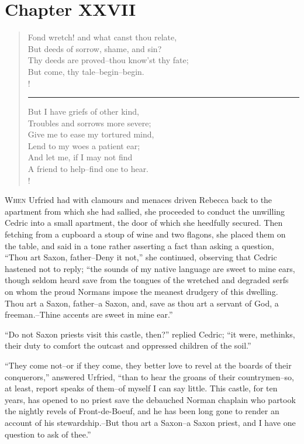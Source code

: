 \chapter{Chapter XXVII}

\begin{verse}
Fond wretch! and what canst thou relate,\\
But deeds of sorrow, shame, and sin?\\
Thy deeds are proved--thou know'st thy fate;\\
But come, thy tale--begin--begin.\\!
\rule{.7\textwidth}{.2pt}

But I have griefs of other kind,\\
Troubles and sorrows more severe;\\
Give me to ease my tortured mind,\\
Lend to my woes a patient ear;\\
And let me, if I may not find\\
A friend to help--find one to hear.\\!
\end{verse}

\lettrine{W}{hen} Urfried had with clamours and menaces driven Rebecca
back to the
apartment from which she had sallied, she proceeded to conduct the
unwilling Cedric into a small apartment, the door of which she heedfully
secured. Then fetching from a cupboard a stoup of wine and two flagons,
she placed them on the table, and said in a tone rather asserting a fact
than asking a question, ``Thou art Saxon, father--Deny it not,'' she
continued, observing that Cedric hastened not to reply; ``the sounds of
my native language are sweet to mine ears, though seldom heard save from
the tongues of the wretched and degraded serfs on whom the proud Normans
impose the meanest drudgery of this dwelling. Thou art a Saxon,
father--a Saxon, and, save as thou art a servant of God, a
freeman.--Thine accents are sweet in mine ear.''

``Do not Saxon priests visit this castle, then?'' replied Cedric; ``it
were, methinks, their duty to comfort the outcast and oppressed children
of the soil.''

``They come not--or if they come, they better love to revel at the
boards of their conquerors,'' answered Urfried, ``than to hear the
groans of their countrymen--so, at least, report speaks of them--of
myself I can say little. This castle, for ten years, has opened to no
priest save the debauched Norman chaplain who partook the nightly revels
of Front-de-Boeuf, and he has been long gone to render an account of his
stewardship.--But thou art a Saxon--a Saxon priest, and I have one
question to ask of thee.''

